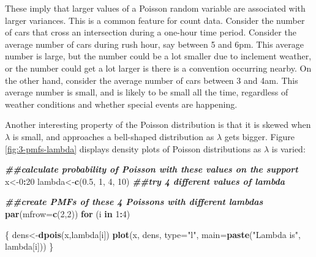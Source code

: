 \documentclass[
]{book}
\newenvironment{Shaded}{\begin{snugshade}}{\end{snugshade}}
\newcommand{\AttributeTok}[1]{\textcolor[rgb]{0.13,0.29,0.53}{#1}}
\newcommand{\ControlFlowTok}[1]{\textcolor[rgb]{0.13,0.29,0.53}{\textbf{#1}}}
\newcommand{\DecValTok}[1]{\textcolor[rgb]{0.00,0.00,0.81}{#1}}
\newcommand{\DocumentationTok}[1]{\textcolor[rgb]{0.56,0.35,0.01}{\textbf{\textit{#1}}}}
\newcommand{\FloatTok}[1]{\textcolor[rgb]{0.00,0.00,0.81}{#1}}
\newcommand{\FunctionTok}[1]{\textcolor[rgb]{0.13,0.29,0.53}{\textbf{#1}}}
\newcommand{\NormalTok}[1]{#1}
\newcommand{\OtherTok}[1]{\textcolor[rgb]{0.56,0.35,0.01}{#1}}
\newcommand{\SpecialCharTok}[1]{\textcolor[rgb]{0.81,0.36,0.00}{\textbf{#1}}}
\newcommand{\StringTok}[1]{\textcolor[rgb]{0.31,0.60,0.02}{#1}}
\begin{document}
These imply that larger values of a Poisson random variable are associated with larger variances. This is a common feature for count data. Consider the number of cars that cross an intersection during a one-hour time period. Consider the average number of cars during rush hour, say between 5 and 6pm. This average number is large, but the number could be a lot smaller due to inclement weather, or the number could get a lot larger is there is a convention occurring nearby. On the other hand, consider the average number of cars between 3 and 4am. This average number is small, and is likely to be small all the time, regardless of weather conditions and whether special events are happening.

Another interesting property of the Poisson distribution is that it is skewed when \(\lambda\) is small, and approaches a bell-shaped distribution as \(\lambda\) gets bigger. Figure \ref{fig:3-pmfs-lambda} displays density plots of Poisson distributions as \(\lambda\) is varied:

\begin{Shaded}
\begin{Highlighting}[]
\DocumentationTok{\#\#calculate probability of Poisson with these values on the support}
\NormalTok{x}\OtherTok{\textless{}{-}}\DecValTok{0}\SpecialCharTok{:}\DecValTok{20}
\NormalTok{lambda}\OtherTok{\textless{}{-}}\FunctionTok{c}\NormalTok{(}\FloatTok{0.5}\NormalTok{, }\DecValTok{1}\NormalTok{, }\DecValTok{4}\NormalTok{, }\DecValTok{10}\NormalTok{) }\DocumentationTok{\#\#try 4 different values of lambda}

\DocumentationTok{\#\#create PMFs of these 4 Poissons with different lambdas}
\FunctionTok{par}\NormalTok{(}\AttributeTok{mfrow=}\FunctionTok{c}\NormalTok{(}\DecValTok{2}\NormalTok{,}\DecValTok{2}\NormalTok{))}
\ControlFlowTok{for}\NormalTok{ (i }\ControlFlowTok{in} \DecValTok{1}\SpecialCharTok{:}\DecValTok{4}\NormalTok{)}
  
\NormalTok{\{}
\NormalTok{  dens}\OtherTok{\textless{}{-}}\FunctionTok{dpois}\NormalTok{(x,lambda[i])}
  \FunctionTok{plot}\NormalTok{(x, dens, }\AttributeTok{type=}\StringTok{"l"}\NormalTok{, }\AttributeTok{main=}\FunctionTok{paste}\NormalTok{(}\StringTok{"Lambda is"}\NormalTok{, lambda[i]))}
\NormalTok{\}}
\end{Highlighting}
\end{Shaded}
\end{document}
